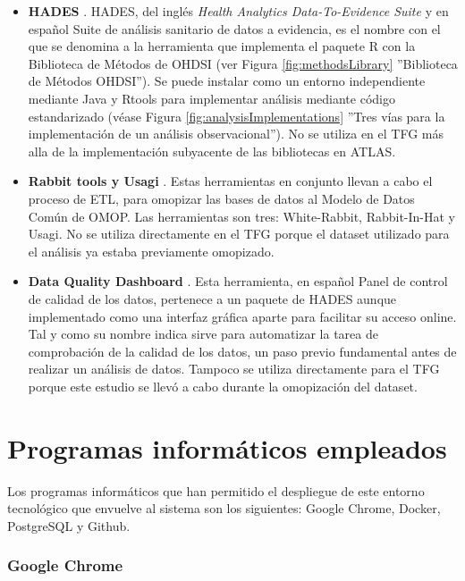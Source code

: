 \begin{itemize}
    
    \item \textbf{HADES} \cite{githubHADES}. HADES, del inglés\textit{ Health Analytics Data-To-Evidence Suite} y en español Suite de análisis sanitario de datos a evidencia, es el nombre con el que se denomina a la herramienta que implementa el paquete R con la Biblioteca de Métodos de OHDSI (ver Figura \ref{fig:methodsLibrary} ''Biblioteca de Métodos OHDSI''). Se puede instalar como un entorno independiente mediante Java y Rtools para implementar análisis mediante código estandarizado (véase Figura \ref{fig:analysisImplementations} ''Tres vías para la implementación de un análisis observacional''). No se utiliza en el TFG más alla de la implementación subyacente de las bibliotecas en ATLAS.
    \item \textbf{Rabbit tools y Usagi} \cite{OHDSIsoftTools}. Estas herramientas en conjunto llevan a cabo el proceso de ETL, para omopizar las bases de datos al Modelo de Datos Común de OMOP. Las herramientas son tres: White-Rabbit, Rabbit-In-Hat y Usagi. No se utiliza directamente en el TFG porque el dataset utilizado para el análisis ya estaba previamente omopizado.
    \item \textbf{Data Quality Dashboard} \cite{githubDQD}. Esta herramienta, en español Panel de control de calidad de los datos, pertenece a un paquete de HADES aunque implementado como una interfaz gráfica aparte para facilitar su acceso online. Tal y como su nombre indica sirve para automatizar la tarea de comprobación de la calidad de los datos, un paso previo fundamental antes de realizar un análisis de datos. Tampoco se utiliza directamente para el TFG porque este estudio se llevó a cabo durante la omopización del dataset.
        
\end{itemize}

\section{Programas informáticos empleados} \label{sec:07programas}

Los programas informáticos que han permitido el despliegue de este entorno tecnológico que envuelve al sistema son los siguientes:  Google Chrome, Docker, PostgreSQL y Github.


\subsubsection{Google Chrome}

